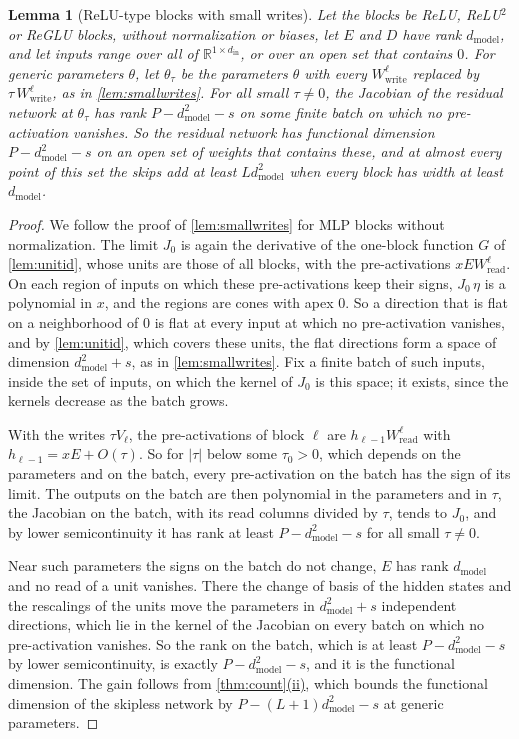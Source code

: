 \documentclass[10pt]{article}
\newtheorem{lemma}[theorem]{Lemma}
\theoremstyle{definition}
\theoremstyle{remark}
\newcommand{\R}{\mathbb{R}}
\newcommand{\Wread}{W_{\mathrm{read}}}
\newcommand{\Wwrite}{W_{\mathrm{write}}}
\newcommand{\dm}{d_{\mathrm{model}}}
\DeclareRobustCommand{\cpref}[2]{\hyperref[#1:#2]{\cref*{#1}(#2)}}
\begin{document}
\begin{lemma}[ReLU-type blocks with small writes]\label{lem:relusmall}
Let the blocks be ReLU, ReLU$^2$ or ReGLU blocks, without normalization or biases, let $E$ and $D$ have rank $\dm$, and let inputs range over all of $\R^{1\times d_{\mathrm{in}}}$, or over an open set that contains $0$. For generic parameters $\theta$, let $\theta_\tau$ be the parameters $\theta$ with every $\Wwrite^{\ell}$ replaced by $\tau\,\Wwrite^{\ell}$, as in \cref{lem:smallwrites}. For all small $\tau \neq 0$, the Jacobian of the residual network at $\theta_\tau$ has rank $P - \dm^2 - s$ on some finite batch on which no pre-activation vanishes. So the residual network has functional dimension $P - \dm^2 - s$ on an open set of weights that contains these, and at almost every point of this set the skips add at least $L\dm^2$ when every block has width at least $\dm$.
\end{lemma}

\begin{proof}
We follow the proof of \cref{lem:smallwrites} for MLP blocks without normalization. The limit $J_0$ is again the derivative of the one-block function $G$ of \cref{lem:unitid}, whose units are those of all blocks, with the pre-activations $xE\Wread^{\ell}$. On each region of inputs on which these pre-activations keep their signs, $J_0\,\eta$ is a polynomial in $x$, and the regions are cones with apex $0$. So a direction that is flat on a neighborhood of $0$ is flat at every input at which no pre-activation vanishes, and by \cref{lem:unitid}, which covers these units, the flat directions form a space of dimension $\dm^2 + s$, as in \cref{lem:smallwrites}. Fix a finite batch of such inputs, inside the set of inputs, on which the kernel of $J_0$ is this space; it exists, since the kernels decrease as the batch grows.

With the writes $\tau V_\ell$, the pre-activations of block $\ell$ are $h_{\ell-1}\Wread^{\ell}$ with $h_{\ell-1} = xE + O(\tau)$. So for $\lvert\tau\rvert$ below some $\tau_0 > 0$, which depends on the parameters and on the batch, every pre-activation on the batch has the sign of its limit. The outputs on the batch are then polynomial in the parameters and in $\tau$, the Jacobian on the batch, with its read columns divided by $\tau$, tends to $J_0$, and by lower semicontinuity it has rank at least $P - \dm^2 - s$ for all small $\tau \neq 0$.

Near such parameters the signs on the batch do not change, $E$ has rank $\dm$ and no read of a unit vanishes. There the change of basis of the hidden states and the rescalings of the units move the parameters in $\dm^2 + s$ independent directions, which lie in the kernel of the Jacobian on every batch on which no pre-activation vanishes. So the rank on the batch, which is at least $P - \dm^2 - s$ by lower semicontinuity, is exactly $P - \dm^2 - s$, and it is the functional dimension. The gain follows from \cpref{thm:count}{ii}, which bounds the functional dimension of the skipless network by $P - (L+1)\dm^2 - s$ at generic parameters.
\end{proof}
\end{document}
